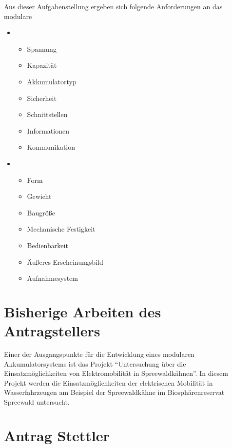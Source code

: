 Aus dieser Aufgabenstellung ergeben sich folgende Anforderungen an das modulare
\begin{itemize}

\item \begin{itemize}Allgemeine Anforderungen
			\item Spannung
			\item Kapazität
			\item Akkumulatortyp
			\item Sicherheit
			\item Schnittstellen
			\item Informationen
			\item Kommunikation
			\end{itemize}
\item \begin{itemize}Konstruktive Anforderungen
			\item Form
			\item  Gewicht
			\item  Baugröße
			\item  Mechanische Festigkeit
			\item  Bedienbarkeit
			\item  Äußeres Erscheinungsbild
			\item  Aufnahmesystem
			\end{itemize}
\end{itemize}





\section{Bisherige Arbeiten des Antragstellers}
\label{sec:BisherigeArbeitenDesAntragstellers}

Einer der Ausgangspunkte für die Entwicklung eines modularen Akkumulatorsystems ist das Projekt "`Untersuchung über die Einsatzmöglichkeiten von Elektromobilität in Spreewaldkähnen"'. In diesem Projekt werden die Einsatzmöglichkeiten der
elektrischen Mobilität in Wasserfahrzeugen am Beispiel der Spreewaldkähne im
Biosphärenreservat Spreewald untersucht.



\section{Antrag Stettler}

